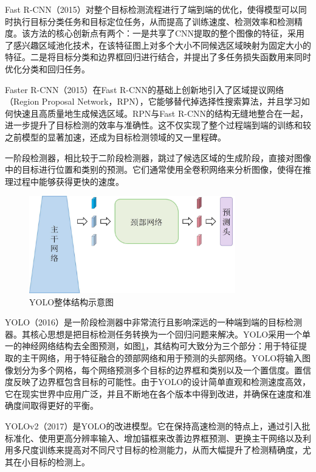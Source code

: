 Fast R-CNN\cite{girshick2015fast}（2015）对整个目标检测流程进行了端到端的优化，使得模型可以同时执行目标分类任务和目标定位任务，从而提高了训练速度、检测效率和检测精度。该方法的核心创新点有两个：一是共享了CNN提取的整个图像的特征，采用了感兴趣区域池化技术，在该特征图上对多个大小不同候选区域映射为固定大小的特征。二是将目标分类和边界框回归进行结合，并提出了多任务损失函数用来同时优化分类和回归任务。

Faster R-CNN\cite{ren2015faster}（2015）在Fast R-CNN的基础上创新地引入了区域提议网络（Region Proposal Network，RPN），它能够替代掉选择性搜索算法，并且学习如何快速且高质量地生成候选区域。RPN与Fast R-CNN的结构无缝地整合在一起，进一步提升了目标检测的效率与准确性。这不仅实现了整个过程端到端的训练和较之前模型的显著加速，还成为目标检测领域的又一里程碑。

一阶段检测器，相比较于二阶段检测器，跳过了候选区域的生成阶段，直接对图像中的目标进行位置和类别的预测。它们通常使用全卷积网络来分析图像，使得在推理过程中能够获得更快的速度。

\begin{figure}[htbp]
  \centering
  \includegraphics[width=0.8\textwidth]{figures/chap02_yolo.jpg}
  \caption{YOLO整体结构示意图}
  \label{fig:chap02_yolo}
\end{figure}

YOLO\cite{redmon2016you}（2016）是一阶段检测器中非常流行且影响深远的一种端到端的目标检测器。其核心思想是把目标检测任务转换为一个回归问题来解决。YOLO采用一个单一的神经网络结构去全图预测，如图\ref{fig:chap02_yolo}，其结构可大致分为三个部分：用于特征提取的主干网络，用于特征融合的颈部网络和用于预测的头部网络。YOLO将输入图像划分为多个网格，每个网络预测多个目标的边界框和类别以及一个置信度。置信度反映了边界框包含目标的可能性。由于YOLO的设计简单直观和检测速度高效，它在现实世界中应用广泛，并且不断地在各个版本中得到改进，并确保在速度和准确度间取得更好的平衡。

YOLOv2\cite{redmon2017yolo9000}（2017）是YOLO\cite{redmon2016you}的改进模型。它在保持高速检测的特点上，通过引入批标准化、使用更高分辨率输入、增加锚框来改善边界框预测、更换主干网络以及利用多尺度训练来提高对不同尺寸目标的检测能力，从而大幅提升了检测精确度，尤其在小目标的检测上。

